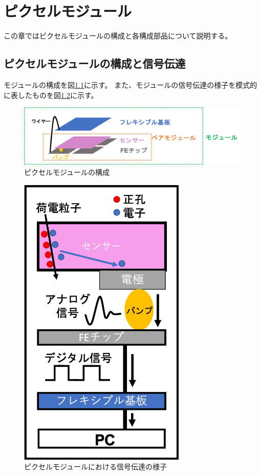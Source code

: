 \chapter{ピクセルモジュール}
この章ではピクセルモジュールの構成と各構成部品について説明する。

\section{ピクセルモジュールの構成と信号伝達}
モジュールの構成を図\ref{module_configuration}に示す。
また、モジュールの信号伝達の様子を模式的に表したものを図\ref{module_electric_overview}に示す。

\begin{figure}[bpt]\centering
\includegraphics[width=14cm]{module_configuration}
\caption[ピクセルモジュールの構成]{ピクセルモジュールの構成}
\label{module_configuration}
\end{figure}

\begin{figure}[bpt]\centering
\includegraphics[width=8cm]{module_electric_overview}
\caption[ピクセルモジュールにおける信号伝達の様子]{ピクセルモジュールにおける信号伝達の様子}
\label{module_electric_overview}
\end{figure}

